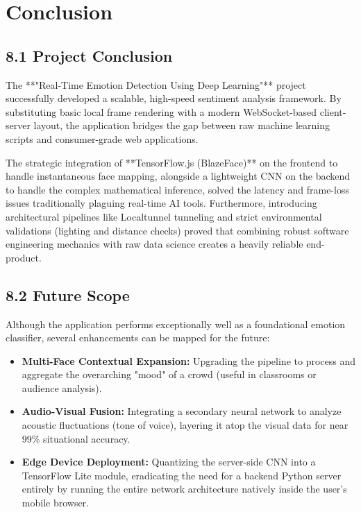 \documentclass[12pt,a4paper]{report}
\begin{document}
\clearpage


\chapter{Conclusion}

\section*{8.1 Project Conclusion}
The **"Real-Time Emotion Detection Using Deep Learning"** project successfully developed a scalable, high-speed sentiment analysis framework. By substituting basic local frame rendering with a modern WebSocket-based client-server layout, the application bridges the gap between raw machine learning scripts and consumer-grade web applications. 

The strategic integration of **TensorFlow.js (BlazeFace)** on the frontend to handle instantaneous face mapping, alongside a lightweight CNN on the backend to handle the complex mathematical inference, solved the latency and frame-loss issues traditionally plaguing real-time AI tools. Furthermore, introducing architectural pipelines like Localtunnel tunneling and strict environmental validations (lighting and distance checks) proved that combining robust software engineering mechanics with raw data science creates a heavily reliable end-product.

\section*{8.2 Future Scope}
Although the application performs exceptionally well as a foundational emotion classifier, several enhancements can be mapped for the future:
\begin{itemize}
    \item \textbf{Multi-Face Contextual Expansion:} Upgrading the pipeline to process and aggregate the overarching "mood" of a crowd (useful in classrooms or audience analysis).
    \item \textbf{Audio-Visual Fusion:} Integrating a secondary neural network to analyze acoustic fluctuations (tone of voice), layering it atop the visual data for near 99\% situational accuracy.
    \item \textbf{Edge Device Deployment:} Quantizing the server-side CNN into a TensorFlow Lite module, eradicating the need for a backend Python server entirely by running the entire network architecture natively inside the user's mobile browser.
\end{itemize}
\end{document}
